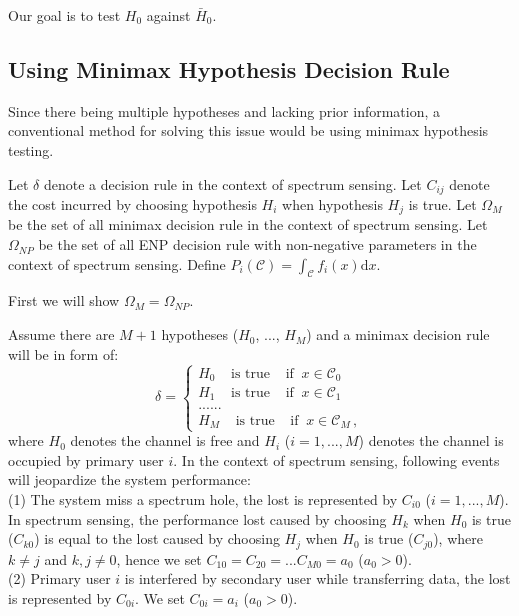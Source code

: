 \documentclass[12pt,journal,a4paper,twoside,onecolumn]{IEEEtran}
\begin{document}
\begin{spacing}{2.5}
Our goal is to test $H_0$ against $\bar{H}_0$. 

\subsection{Using Minimax Hypothesis Decision Rule}
Since there being multiple hypotheses and lacking prior information, a conventional method for solving this issue would be using minimax hypothesis testing. 

Let $\delta$ denote a decision rule in the context of spectrum sensing.
Let $C_{ij}$ denote the cost incurred by choosing hypothesis $H_i$ when hypothesis $H_j$ is true. 
Let $\Omega_{M}$ be the set of all minimax decision rule in the context of spectrum sensing.
Let $\Omega_{NP}$ be the set of all ENP decision rule with non-negative parameters in the context of spectrum sensing.
Define $P_i(\mathcal{C}) = \int_{\mathcal{C}} f_i(x)\mathrm{d}x$. 

First we will show $\Omega_{M} = \Omega_{NP}$.

Assume there are $M+1$ hypotheses ($H_0$, ..., $H_M$) and a minimax decision rule will be in form of:
\begin{equation}
\label{equ: decR}
\delta = \begin{cases}
H_0 \;\;\;\;\text{is true}\;\;\;\;\text{if}\;\; x \in \mathcal{C}_0\\
H_1 \;\;\;\;\text{is true}\;\;\;\;\text{if}\;\; x \in \mathcal{C}_1\\
......\\
H_M \;\;\;\;\text{is true}\;\;\;\;\text{if}\;\; x \in \mathcal{C}_M\,,
\end{cases}
\end{equation}
where $H_0$ denotes the channel is free and $H_i$ ($i = 1, ..., M$) denotes the channel is occupied by primary user $i$.
In the context of spectrum sensing, following events will jeopardize the system performance: 
\\(1) The system miss a spectrum hole, the lost is represented by $C_{i0}$ ($i = 1, ..., M$). In spectrum sensing, the performance lost caused by choosing $H_k$ when $H_0$ is true ($C_{k0}$) is equal to the lost caused by choosing $H_j$ when $H_0$ is true ($C_{j0}$), where $k \neq j$ and $k, j \neq 0$, hence we set $C_{10} = C_{20} = ... C_{M0} = a_0$ ($a_0 > 0$).
\\(2) Primary user $i$ is interfered by secondary user while transferring data, the lost is represented by $C_{0i}$. We set $C_{0i} = a_i$ ($a_0 > 0$).


\end{spacing}
\end{document}
